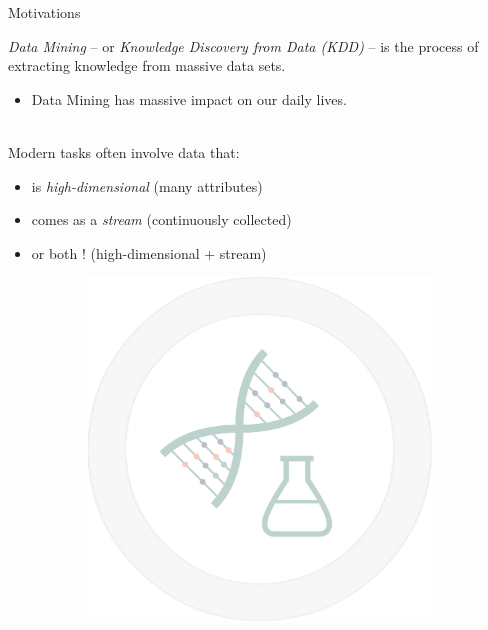 \documentclass[16pt,usenames,dvipsnames, notheorems]{beamer}
\theoremstyle{definition}
\theoremstyle{example}
\theoremstyle{plain}
\begin{document}
\begin{frame}{Motivations}

\textit{Data Mining} -- or \textit{Knowledge Discovery from Data (KDD)} -- is the process of extracting knowledge from massive data sets. 
\begin{itemize}
	\item Data Mining has massive impact on our daily lives. 
\end{itemize}
~\\
\pause
Modern tasks often involve data that: 
\begin{itemize}
	\item is \textit{high-dimensional} (many attributes)
	\pause
	\item comes as a \textit{stream} (continuously collected)
	\pause
	\item or both ! (high-dimensional + stream)
\end{itemize}
\begin{figure}
	\begin{subfigure}[c]{0.25\linewidth}
		\centering
		\begin{overprint}
			 \includegraphics[width=\linewidth]{figures/picture_biology_t.jpg}

\end{overprint}
\end{subfigure}
\end{figure}
\end{frame}
\end{document}
